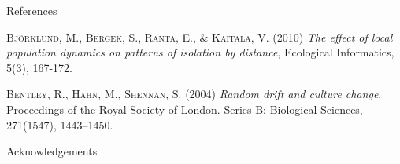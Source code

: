\documentclass[final]{beamer}
\newlength{\onecolwid}
\begin{document}
\begin{frame}[t]
\begin{columns}[t]
\begin{column}{\onecolwid}
\begin{block}{References}
\begin{thebibliography}{50}
\textsc{Bj\"{o}rklund, M., Bergek, S., Ranta, E., \& Kaitala, V. (2010)}
\textit{The effect of local population dynamics on patterns of isolation by distance}, Ecological Informatics, 5(3), 167-172.

\textsc{Bentley, R., Hahn, M., Shennan, S. (2004)}
\textit{Random drift and culture change}, Proceedings of the Royal Society of London. Series B: Biological Sciences, 271(1547), 1443--1450.


\end{thebibliography}
%	

\end{block}



\begin{block}{Acknowledgements}

\small{}

\end{block}





\end{column}
\end{columns}
\end{frame}
\end{document}
